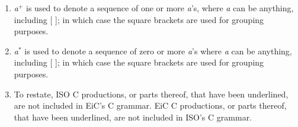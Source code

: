 \begin{enumerate}
\item   {\it a}$^+$ is used to denote a sequence of one or more {\it a}'s,
	where {\it a} can be anything, including [ ]; in which case the 
	square brackets are used for grouping purposes. 
\item   {\it a}$^*$ is used to denote a sequence of zero or more {\it a}'s
	where {\it a} can be anything, including [ ]; in which case the 
	square brackets are used for grouping purposes.
 
\item   To restate, ISO C productions, or parts thereof, that have been 
underlined, are not included in EiC's C grammar. EiC C productions, or parts thereof, that
have been underlined, are not included in ISO's C grammar. 

\end{enumerate}

\footnotesize

